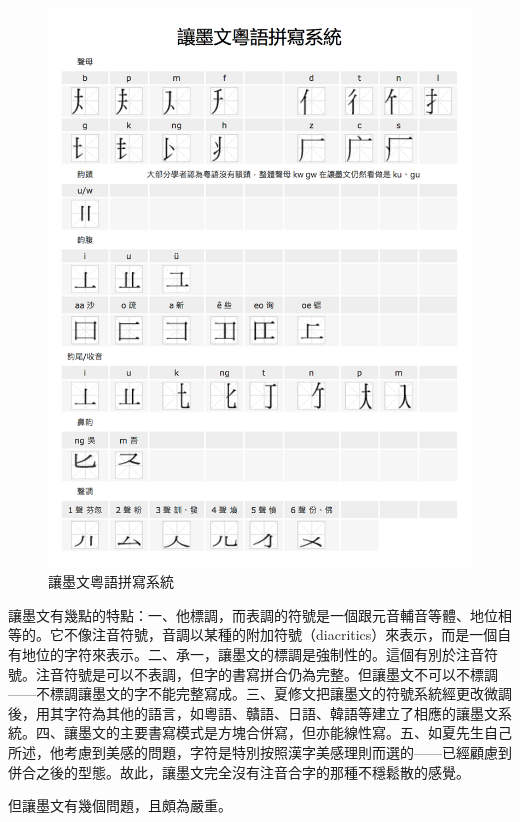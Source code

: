 \documentclass[a5paper, 12pt, openany]{book} %
\begin{document}
\begin{figure}[H]
  \centering
  \includegraphics[width=1\textwidth]{./images/rangmowen_6.png}
  \caption{讓墨文粵語拼寫系統}
  \label{fig:rangmowen_6}
\end{figure}

	
讓墨文有幾點的特點：一、他標調，而表調的符號是一個跟元音輔音等體、地位相等的。它不像注音符號，音調以某種的附加符號（diacritics）來表示，而是一個自有地位的字符來表示。二、承一，讓墨文的標調是強制性的。這個有別於注音符號。注音符號是可以不表調，但字的書寫拼合仍為完整。但讓墨文不可以不標調——不標調讓墨文的字不能完整寫成。三、夏修文把讓墨文的符號系統經更改微調後，用其字符為其他的語言，如粵語、贛語、日語、韓語等建立了相應的讓墨文系統。四、讓墨文的主要書寫模式是方塊合併寫，但亦能線性寫。五、如夏先生自己所述，他考慮到美感的問題，字符是特別按照漢字美感理則而選的——已經顧慮到併合之後的型態。故此，讓墨文完全沒有注音合字的那種不穩鬆散的感覺。

但讓墨文有幾個問題，且頗為嚴重。
\end{document}
